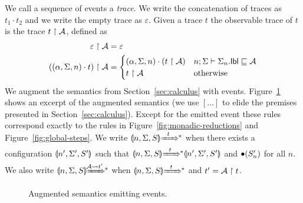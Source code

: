 We call a sequence of events a \emph{trace}. We write the concatenation of traces as $t_1 \cdot t_2$ and we write the empty trace as $\varepsilon$. Given a trace $t$ the observable trace of $t$ is the trace $t \upharpoonright \mathcal{A}$, defined as
\begin{align*}
\varepsilon \upharpoonright \mathcal{A} &= \varepsilon\\
((\alpha, \Sigma, n) \cdot t) \upharpoonright \mathcal{A} &=
\begin{cases}
(\alpha, \Sigma, n) \cdot (t \upharpoonright \mathcal{A}) & n; \Sigma \vdash \Sigma_n.\mathsf{lbl} \sqsubseteq \mathcal{A} \\
t \upharpoonright \mathcal{A} & \text{otherwise}
\end{cases}
\end{align*}
We augment the semantics from Section~\ref{sec:calculus} with events. Figure~\ref{fig:event-semantics} shows an excerpt of the augmented semantics (we use $[\ldots]$ to elide the premises presented in Section~\ref{sec:calculus}). Except for the emitted event these rules correspond exactly to the rules in Figure~\ref{fig:monadic-reductions} and Figure~\ref{fig:global-steps}. We write $\gconfig{n}{\env}{S} \gstepstos[][t]$ when there exists a configuration $\llparenthesis n', \Sigma', S' \rrparenthesis$ such that $\gconfig{n}{\env}{S} \gstepstos[][t] \gconfig{n'}{\env'}{S'}$ and $\bullet(S'_n)$ for all $n$. We also write $\gconfig{n}{\env}{S} \gstepstos[][\Attacker \filtertrace t']$ when $\gconfig{n}{\env}{S} \gstepstos[][t]$ and $t' = \mathcal{A} \upharpoonright t$.

\begin{figure}
\centering
{}
\caption{Augmented semantics emitting events.}
\label{fig:event-semantics}
\end{figure}


